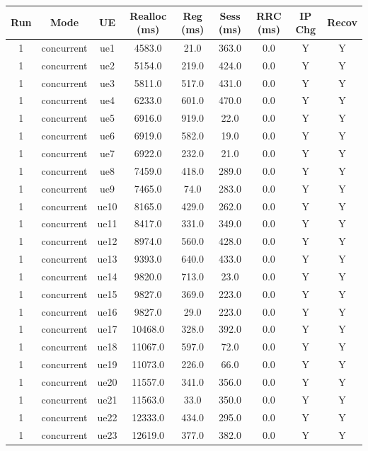 \begin{table}[ht]
\centering
\begin{tabular}{|c|c|c|c|c|c|c|c|c|}
\hline
Run & Mode & UE & Realloc (ms) & Reg (ms) & Sess (ms) & RRC (ms) & IP Chg & Recov \\
\hline
1 & concurrent & ue1 & 4583.0 & 21.0 & 363.0 & 0.0 & Y & Y \\
1 & concurrent & ue2 & 5154.0 & 219.0 & 424.0 & 0.0 & Y & Y \\
1 & concurrent & ue3 & 5811.0 & 517.0 & 431.0 & 0.0 & Y & Y \\
1 & concurrent & ue4 & 6233.0 & 601.0 & 470.0 & 0.0 & Y & Y \\
1 & concurrent & ue5 & 6916.0 & 919.0 & 22.0 & 0.0 & Y & Y \\
1 & concurrent & ue6 & 6919.0 & 582.0 & 19.0 & 0.0 & Y & Y \\
1 & concurrent & ue7 & 6922.0 & 232.0 & 21.0 & 0.0 & Y & Y \\
1 & concurrent & ue8 & 7459.0 & 418.0 & 289.0 & 0.0 & Y & Y \\
1 & concurrent & ue9 & 7465.0 & 74.0 & 283.0 & 0.0 & Y & Y \\
1 & concurrent & ue10 & 8165.0 & 429.0 & 262.0 & 0.0 & Y & Y \\
1 & concurrent & ue11 & 8417.0 & 331.0 & 349.0 & 0.0 & Y & Y \\
1 & concurrent & ue12 & 8974.0 & 560.0 & 428.0 & 0.0 & Y & Y \\
1 & concurrent & ue13 & 9393.0 & 640.0 & 433.0 & 0.0 & Y & Y \\
1 & concurrent & ue14 & 9820.0 & 713.0 & 23.0 & 0.0 & Y & Y \\
1 & concurrent & ue15 & 9827.0 & 369.0 & 223.0 & 0.0 & Y & Y \\
1 & concurrent & ue16 & 9827.0 & 29.0 & 223.0 & 0.0 & Y & Y \\
1 & concurrent & ue17 & 10468.0 & 328.0 & 392.0 & 0.0 & Y & Y \\
1 & concurrent & ue18 & 11067.0 & 597.0 & 72.0 & 0.0 & Y & Y \\
1 & concurrent & ue19 & 11073.0 & 226.0 & 66.0 & 0.0 & Y & Y \\
1 & concurrent & ue20 & 11557.0 & 341.0 & 356.0 & 0.0 & Y & Y \\
1 & concurrent & ue21 & 11563.0 & 33.0 & 350.0 & 0.0 & Y & Y \\
1 & concurrent & ue22 & 12333.0 & 434.0 & 295.0 & 0.0 & Y & Y \\
1 & concurrent & ue23 & 12619.0 & 377.0 & 382.0 & 0.0 & Y & Y \\

\end{tabular}
\end{table}
